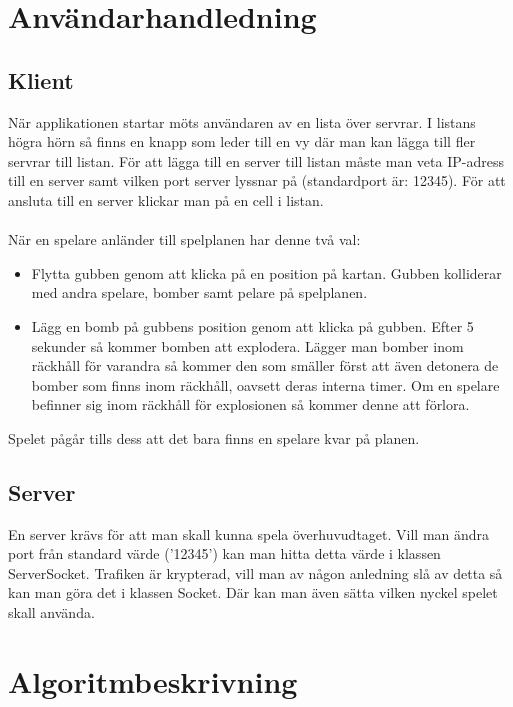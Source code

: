 \documentclass[10pt, titlepage, oneside, a4paper]{article}
\begin{document}
		
    \section{Användarhandledning}
    	\subsection{Klient}
    		När applikationen startar möts användaren av en lista över servrar. I listans högra hörn så finns en knapp som leder till en vy där man kan lägga till fler servrar till listan. För att lägga till en server till listan måste man veta IP-adress till en server samt vilken port server lyssnar på (standardport är: 12345). För att ansluta till en server klickar man på en cell i listan.\\\\När en spelare anländer till spelplanen har denne två val:
    		\begin{itemize}
    			\item Flytta gubben genom att klicka på en position på kartan. Gubben kolliderar med andra spelare, bomber samt pelare på spelplanen.
    			\item Lägg en bomb på gubbens position genom att klicka på gubben. Efter 5 sekunder så kommer bomben att explodera. Lägger man bomber inom räckhåll för varandra så kommer den som smäller först att även detonera de bomber som finns inom räckhåll, oavsett deras interna timer. Om en spelare befinner sig inom räckhåll för explosionen så kommer denne att förlora.
    		\end{itemize}
    		
    		Spelet pågår tills dess att det bara finns en spelare kvar på planen.
    		
    	\subsection{Server}
    		En server krävs för att man skall kunna spela överhuvudtaget. Vill man ändra port från standard värde ('12345') kan man hitta detta värde i klassen ServerSocket. Trafiken är krypterad, vill man av någon anledning slå av detta så kan man göra det i klassen Socket. Där kan man även sätta vilken nyckel spelet skall använda.
    		
    	\newpage
    	
    \section{Algoritmbeskrivning}
\end{document}
